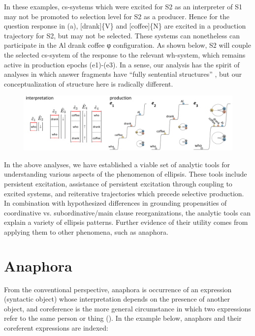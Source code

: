   In these examples, cs-systems which were excited for S2 as an interpreter of S1 may not be promoted to selection level for S2 as a producer. Hence for the question response in (a), [drank]\{V\} and [coffee]\{N\} are excited in a production trajectory for S2, but may not be selected. These systems can nonetheless can participate in the {\textbar}Al drank coffee{\textbar} φ configuration. As shown below, S2 will couple the selected cs-system of the response to the relevant wh-system, which remains active in production epochs (e1)-(e3). In a sense, our analysis has the spirit of analyses in which answer fragments have “fully sentential structures”  \citep{Merchant2005}, but our conceptualization of structure here is radically different.

  
\begin{figure}
\includegraphics[width=\textwidth]{figures/Tilsen-img151.png}
\caption{\missingcaption}
\label{fig:}
\end{figure}
 

  In the above analyses, we have established a viable set of analytic tools for understanding various aspects of the phenomenon of ellipsis. These tools include persistent excitation, assistance of persistent excitation through coupling to excited systems, and reiterative trajectories which precede selective production. In combination with hypothesized differences in grounding propensities of coordinative vs. subordinative/main clause reorganizations, the analytic tools can explain a variety of ellipsis patterns. Further evidence of their utility comes from applying them to other phenomena, such as anaphora.

\section{Anaphora}

From the conventional perspective, anaphora is occurrence of an expression (syntactic object) whose interpretation depends on the presence of another object, and coreference is the more general circumstance in which two expressions refer to the same person or thing (\citealt{HankamerSag1976,Huang2000,Reinhart1983,Reinhart2016,Safir2004}). In the example below, anaphors and their coreferent expressions are indexed:

